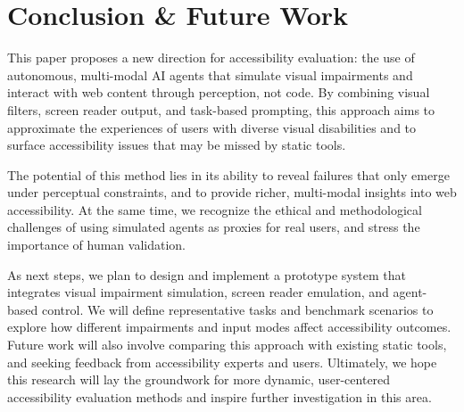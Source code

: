 
\section{Conclusion \& Future Work}

This paper proposes a new direction for accessibility evaluation: the use of autonomous, multi-modal \ac{AI} agents that simulate visual impairments and interact with web content through perception, not code. By combining visual filters, screen reader output, and task-based prompting, this approach aims to approximate the experiences of users with diverse visual disabilities and to surface accessibility issues that may be missed by static tools.

The potential of this method lies in its ability to reveal failures that only emerge under perceptual constraints, and to provide richer, multi-modal insights into web accessibility. At the same time, we recognize the ethical and methodological challenges of using simulated agents as proxies for real users, and stress the importance of human validation.

As next steps, we plan to design and implement a prototype system that integrates visual impairment simulation, screen reader emulation, and agent-based control. We will define representative tasks and benchmark scenarios to explore how different impairments and input modes affect accessibility outcomes. Future work will also involve comparing this approach with existing static tools, and seeking feedback from accessibility experts and users. Ultimately, we hope this research will lay the groundwork for more dynamic, user-centered accessibility evaluation methods and inspire further investigation in this area.